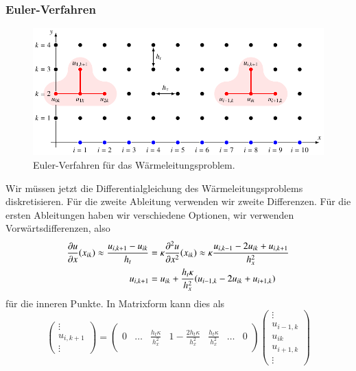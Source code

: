 \subsubsection{Euler-Verfahren}
\begin{figure}
\centering
\includegraphics{chapters/70-pde/images/euler.pdf}
\caption{Euler-Verfahren für das Wärmeleitungsproblem.
%
\label{buch:pde:figure:euler}}
\end{figure}
Wir müssen jetzt die Differentialgleichung des Wärmeleitungsproblems
diskretisieren.
Für die zweite Ableitung verwenden wir zweite Differenzen.
Für die ersten Ableitungen haben wir verschiedene Optionen, wir
verwenden Vorwärtsdifferenzen, also
\begin{align}
\frac{\partial u}{\partial x}(x_{ik})
\approx
\frac{u_{i,k+1}-u_{ik}}{h_t}
&=
\kappa
\frac{\partial^2u}{\partial x^2}(x_{ik})
\approx
\kappa
\frac{u_{i,k-1}-2u_{ik}+u_{i,k+1}}{h_x^2}
\notag
\\
u_{i,k+1}
&=
u_{ik} + \frac{h_t\kappa}{h_x^2} (u_{i-1,k}-2u_{ik}+u_{i+1,k})
\label{buch:pde:waerme:euler}
\end{align}
für die inneren Punkte.
In Matrixform kann dies als
\[
\begin{pmatrix}
\vdots\\
u_{i,k+1}\\
\vdots
\end{pmatrix}
=
\begin{pmatrix}
&&&&\\
0&\dots
	&\displaystyle\frac{h_t\kappa}{h_x^2}
		&\displaystyle1-\frac{2h_t\kappa}{h_x^2}
			&\displaystyle\frac{h_t\kappa}{h_x^2}
				&\dots
					&0\\
&&&&
\end{pmatrix}
\begin{pmatrix}
\vdots\\
u_{i-1,k}\\
u_{ik}\\
u_{i+1,k}\\
\vdots
\end{pmatrix}
\]
